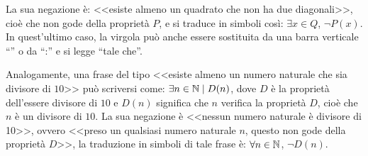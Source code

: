 La sua negazione è: <<esiste almeno un quadrato che non ha due diagonali>>, cioè che non gode della proprietà $P$, e si traduce in simboli così: $\exists x\in Q$, $\neg P(x)$.
In quest'ultimo caso, la virgola può anche essere sostituita da una barra verticale ``\textbar'' o da ``:'' e si legge ``tale che''.

Analogamente, una frase del tipo <<esiste almeno un numero naturale che sia divisore di $10$>> può scriversi come: $\exists n\in\mathbb{N}\mid D(n)$, dove $D$ è la proprietà dell'essere divisore di $10$ e $D(n)$ significa che $n$ verifica la proprietà $D$, cioè che $n$ è un divisore di $10$. La sua negazione è <<nessun numero naturale è divisore di 10>>, ovvero <<preso un qualsiasi numero naturale $n$, questo non gode della proprietà $D$>>, la traduzione in simboli di tale frase è: $\forall n\in\mathbb{N}$, ${\neg}D(n)$.

